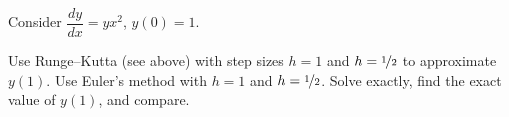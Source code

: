\documentclass{ximera}
\begin{document}
\begin{exercise}
    Consider $\dfrac{dy}{dx} = yx^2$, $y(0)=1$.
    \begin{tasks}
        \task Use Runge--Kutta (see above) with step sizes $h=1$ and $h=\nicefrac{1}{2}$ to approximate $y(1)$.
        \task Use Euler's method with $h=1$ and $h=\nicefrac{1}{2}$.
        \task Solve exactly, find the exact value of $y(1)$, and compare.
    \end{tasks}
\end{exercise}
%
\end{document}
